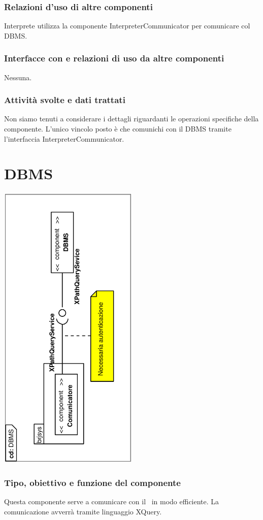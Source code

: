\documentclass[11pt,titlepage,a4paper]{report}
\begin{document}
\subsubsection{Relazioni d'uso di altre componenti}
Interprete utilizza la componente InterpreterCommunicator per comunicare col DBMS.
\subsubsection{Interfacce con e relazioni di uso da altre componenti}
Nessuna.
\subsubsection{Attivit\`a svolte e dati trattati}
Non siamo tenuti a considerare i dettagli riguardanti le operazioni specifiche della componente. L'unico vincolo posto \`e che comunichi con il DBMS tramite l'interfaccia InterpreterCommunicator.
\section{DBMS}
\begin{center}
 \includegraphics[width=0.5\textwidth, angle=-90]{DiagrammaClassi/DBMS.eps}
\end{center}
\subsubsection{Tipo, obiettivo e funzione del componente}
Questa componente serve a comunicare con il \re\ in modo efficiente. La comunicazione avverr\`a tramite linguaggio XQuery.
\end{document}
